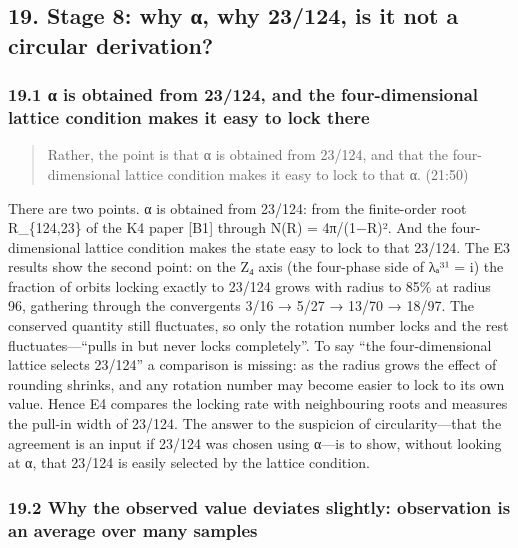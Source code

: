 \documentclass[
  a4paper,
]{article}
\begin{document}
\subsection{19. Stage 8: why α, why 23/124, is it not a circular
derivation?}\label{stage-8-why-ux3b1-why-23124-is-it-not-a-circular-derivation}

\subsubsection{19.1 α is obtained from 23/124, and the four-dimensional
lattice condition makes it easy to lock
there}\label{ux3b1-is-obtained-from-23124-and-the-four-dimensional-lattice-condition-makes-it-easy-to-lock-there}

\begin{quote}
Rather, the point is that α is obtained from 23/124, and that the
four-dimensional lattice condition makes it easy to lock to that α.
(21:50)
\end{quote}

There are two points. α is obtained from 23/124: from the finite-order
root R\_\{124,23\} of the K4 paper {[}B1{]} through N(R) = 4π/(1−R)².
And the four-dimensional lattice condition makes the state easy to lock
to that 23/124. The E3 results show the second point: on the Z₄ axis
(the four-phase side of λₐ³¹ = i) the fraction of orbits locking exactly
to 23/124 grows with radius to 85\% at radius 96, gathering through the
convergents 3/16 → 5/27 → 13/70 → 18/97. The conserved quantity still
fluctuates, so only the rotation number locks and the rest
fluctuates---``pulls in but never locks completely''. To say ``the
four-dimensional lattice selects 23/124'' a comparison is missing: as
the radius grows the effect of rounding shrinks, and any rotation number
may become easier to lock to its own value. Hence E4 compares the
locking rate with neighbouring roots and measures the pull-in width of
23/124. The answer to the suspicion of circularity---that the agreement
is an input if 23/124 was chosen using α---is to show, without looking
at α, that 23/124 is easily selected by the lattice condition.

\subsubsection{19.2 Why the observed value deviates slightly:
observation is an average over many
samples}\label{why-the-observed-value-deviates-slightly-observation-is-an-average-over-many-samples}
\end{document}
